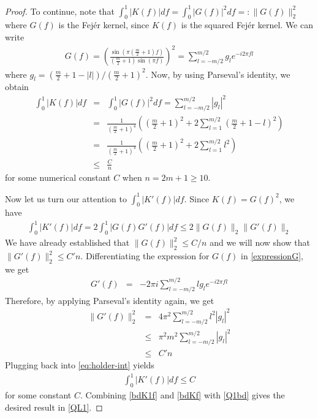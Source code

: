 \begin{proof}
To continue, note that $\int_0^1 | K ( f) | d  f = \int_0^1 | G ( f) |^2 d
 f =: \|G(f)\|_2^2$ where $G ( f)$ is the Fej\'er kernel, since $K(f)$ is the squared
Fej\'er kernel. We can write
\begin{eqnarray}
  G ( f)  =  \left( \frac{\sin \left( \pi \left( \frac{m}{2} + 1 \right) f
  \right)}{\left( \frac{m}{2} + 1 \right) \sin ( \pi f)} \right)^2
   =  \sum_{l = - m / 2}^{m / 2} g_l e^{- i 2 \pi f l}\label{expressionG}
\end{eqnarray}
where $g_l = \left( \frac{m}{2} + 1 - | l | \right) / \left( \frac{m}{2} + 1
\right)^2$. Now, by using Parseval's identity, we obtain
\begin{eqnarray}
 \int_0^1 |K(f)| df & = & \int_0^1 | G ( f) |^2 d f
  =  \sum_{l = - m / 2}^{m / 2} | g_l |^2\nonumber\\
  & = & \frac{1}{\left( \frac{m}{2} + 1 \right)^4} \left( \left( \frac{m}{2}
  + 1 \right)^2 + 2 \sum_{l = 1}^{m / 2} \left( \frac{m}{2} + 1 - l \right)^2
  \right)\nonumber\\
  & = & \frac{1}{\left( \frac{m}{2} + 1 \right)^4} \left( \left( \frac{m}{2}
  + 1 \right)^2 + 2 \sum_{l = 1}^{m / 2} l^2 \right)\nonumber\\
  & \leq & \frac{C}{n}\label{bdKf}
\end{eqnarray}
for some numerical constant $C$ when $n = 2 m + 1 \geq 10$.

Now let us turn our attention to $\int_0^1 | K' (
f) | d  f$. Since $K ( f) = G ( f)^2$, we have
\begin{eqnarray}
  \int_0^1 | K' ( f) | d  f  =  2\int_0^1 | G ( f) G' ( f) | d
   f
   \leq  2\| G ( f) \|_2 \| G' ( f) \|_2\label{eq:holder-int}
\end{eqnarray}
We have already established that $\| G ( f) \|_2^2 \leq C / {n}$ and we
will now show that $\| G' ( f) \|_2^2 \leq C' {n}$. Differentiating the
expression for $G(f)$ in \eqref{expressionG}, we get
\begin{eqnarray*}
  G' ( f) & = & -2 \pi i \sum_{l = - m / 2}^{m / 2} l g_l e^{- i 2 \pi f l}
\end{eqnarray*}
Therefore, by applying Parseval's identity again, we get
\begin{eqnarray*}
  \| G' ( f) \|_2^2 
  & = & 4 \pi^2 \sum_{l = - m / 2}^{m / 2} l^2 | g_l |^2\\
  & \leq &  \pi^2 m^2 \sum_{l = - m / 2}^{m / 2} | g_l |^2\\
  & \leq & C' n
\end{eqnarray*}
Plugging back into \eqref{eq:holder-int} yields
\begin{align}
\int_0^1 |K'(f)| df \leq C \label{bdK1f}
\end{align}
for some constant $C$. Combining \eqref{bdK1f} and \eqref{bdKf} with \eqref{Q1bd} gives the desired result in \eqref{QL1}.




\end{proof}
